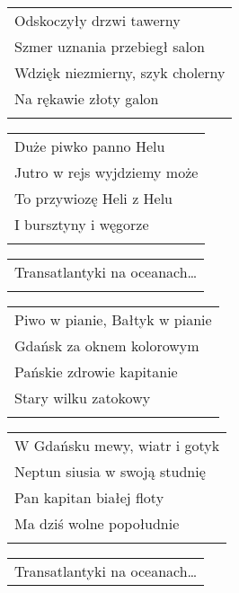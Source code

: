 \documentclass[a5paper]{article}
\begin{document}
\noindent
\begin{tabular}{@{}p{8.50cm}@{}} 
Odskoczyły drzwi tawerny \\
Szmer uznania przebiegł salon \\
Wdzięk niezmierny, szyk cholerny \\
Na rękawie złoty galon \\ \\
\end{tabular}
 
\noindent
\begin{tabular}{@{}p{8.50cm}@{}}
Duże piwko panno Helu \\
Jutro w rejs wyjdziemy może \\
To przywiozę Heli z Helu \\
I bursztyny i węgorze \\ \\
\end{tabular}

\noindent
\begin{tabular}{@{}p{7.50cm}@{}}
Transatlantyki na oceanach… \\ \\
\end{tabular}
 
\noindent
\begin{tabular}{@{}p{8.50cm}@{}}
Piwo w pianie, Bałtyk w pianie \\
Gdańsk za oknem kolorowym \\
Pańskie zdrowie kapitanie \\
Stary wilku zatokowy \\ \\
\end{tabular}
 
\noindent
\begin{tabular}{@{}p{8.50cm}@{}}
W Gdańsku mewy, wiatr i gotyk \\
Neptun siusia w swoją studnię \\
Pan kapitan białej floty \\
Ma dziś wolne popołudnie \\ \\
\end{tabular}

\noindent
\begin{tabular}{@{}p{7.50cm}@{}}
Transatlantyki na oceanach…
\end{tabular}
\end{document}
